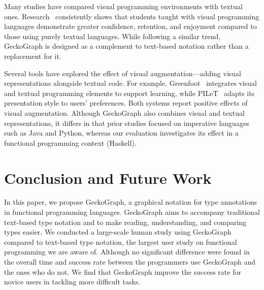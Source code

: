 \documentclass[preprint,12pt]{elsarticle}
\begin{document}
Many studies have compared visual programming environments with textual ones. 
Research~\cite{Noone2018-wl, Da_Silva_Ribeiro2014-tm, Cliburn2008-jo, Daly2011-is} consistently shows that students taught with visual programming languages demonstrate greater confidence, retention, and enjoyment compared to those using purely textual languages. 
While following a similar trend, GeckoGraph is designed as a complement to text-based notation rather than a replacement for it.

Several tools have explored the effect of visual augmentation—adding visual representations alongside textual code. 
For example, Greenfoot~\cite{Montero2010-uh} integrates visual and textual programming elements to support learning, while PILeT~\cite{Alshaigy2015-wy} adapts its presentation style to users’ preferences. 
Both systems report positive effects of visual augmentation. 
Although GeckoGraph also combines visual and textual representations, it differs in that prior studies focused on imperative languages such as Java and Python, whereas our evaluation investigates its effect in a functional programming context (Haskell).



\section{Conclusion and Future Work}
In this paper, we propose GeckoGraph, a graphical notation for type annotations in functional programming languages. GeckoGraph aims to accompany traditional text-based type notation and to make reading, understanding, and comparing types easier. We conducted a large-scale human study using GeckoGraph compared to text-based type notation, the largest user study on functional programming we are aware of. Although no significant difference were found in the overall time
and success rate between the programmers use GeckoGraph and the ones
who do not. We find that GeckoGraph improve the success rate for novice users in tackling more difficult tasks.
\end{document}
